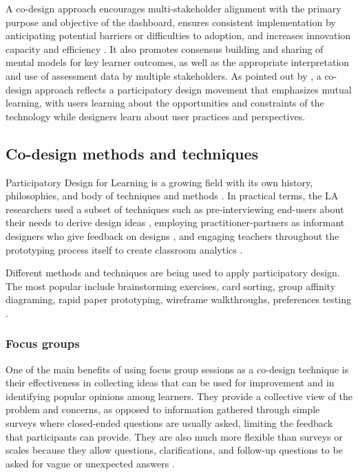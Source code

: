 \documentclass[manuscript,screen,nonacm,12pt]{acmart}
\begin{document}
A co-design approach encourages multi-stakeholder alignment with the primary purpose and objective of the dashboard, ensures consistent implementation by anticipating potential barriers or difficulties to adoption, and increases innovation capacity and efficiency \cite{boscardin2018twelve}. It also promotes consensus building and sharing of mental models for key learner outcomes, as well as the appropriate interpretation and use of assessment data by multiple stakeholders. As pointed out by \citet{schuler1993participatory}, a co-design approach reflects a participatory design movement that emphasizes mutual learning, with users learning about the opportunities and constraints of the technology while designers learn about user practices and perspectives.


\subsection{Co-design methods and techniques}
Participatory Design for Learning is a growing field with its own history, philosophies, and body of techniques and methods \cite{disalvo2017participatory}. In practical terms, the LA researchers used a subset of techniques such as pre-interviewing end-users about 
their needs to derive design ideas \cite{xhakaj2016teachers}, employing practitioner-partners as informant designers who give feedback on 
designs \cite{fiorini2018application}, and engaging teachers throughout the prototyping process itself to create classroom analytics \cite{holstein2018classroom}.

Different methods and techniques are being used to apply participatory design. The most popular include brainstorming exercises, card sorting, group affinity diagraming, rapid paper prototyping, wireframe walkthroughs, preferences testing \cite{abel2013cross}. 

\subsubsection{Focus groups}
One of the main benefits of using focus group sessions as a co-design technique is their effectiveness in collecting ideas that can be used for improvement and in identifying popular opinions among learners.  They provide a collective view of the problem and concerns, as opposed to information gathered through simple surveys where closed-ended questions are usually asked, limiting the feedback that participants can provide. They are also much more flexible than surveys or scales because they allow questions, clarifications, and follow-up questions to be asked for vague or unexpected answers \cite{krueger2014focus}. 
\end{document}
